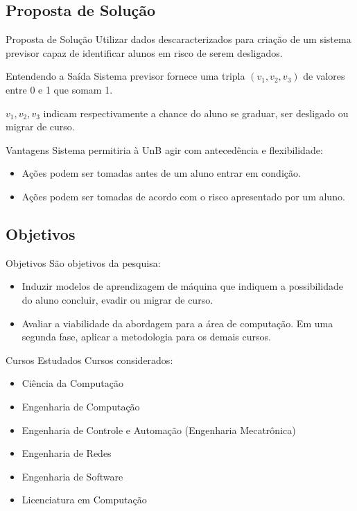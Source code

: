 \subsection{Proposta de Solução}
\begin{frame}{Proposta de Solução}
    Utilizar dados descaracterizados para criação de um sistema previsor capaz de 
    identificar alunos em risco de serem desligados. 
\end{frame}

\begin{frame}{Entendendo a Saída}
    Sistema previsor fornece uma tripla $(v_1, v_2, v_3)$ de valores entre 0 e 1 que
    somam 1. 

    \vspace{0.5cm}

    $v_1, v_2, v_3$ indicam respectivamente a chance do aluno se graduar, ser
    desligado ou migrar de curso. 
\end{frame}

\begin{frame}{Vantagens}
    Sistema permitiria à UnB agir com antecedência e flexibilidade: 
    \begin{itemize}
        \item Ações podem ser tomadas antes de um aluno entrar em condição. 
        \item Ações podem ser tomadas de acordo com o risco apresentado por um aluno.
    \end{itemize}
\end{frame}

\subsection{Objetivos}
\begin{frame}{Objetivos}
    São objetivos da pesquisa: 
    \begin{itemize}
        \item Induzir modelos de aprendizagem de máquina que indiquem a possibilidade
            do aluno concluir, evadir ou migrar de curso. 
        \item Avaliar a viabilidade da abordagem para a área de computação. Em uma
            segunda fase, aplicar a metodologia para os demais cursos. 
    \end{itemize}
\end{frame}

\begin{frame}{Cursos Estudados}
    Cursos considerados: 
    \begin{itemize}
        \item Ciência da Computação
        \item Engenharia de Computação
        \item Engenharia de Controle e Automação (Engenharia Mecatrônica)
        \item Engenharia de Redes
        \item Engenharia de Software
        \item Licenciatura em Computação
    \end{itemize}
\end{frame}

